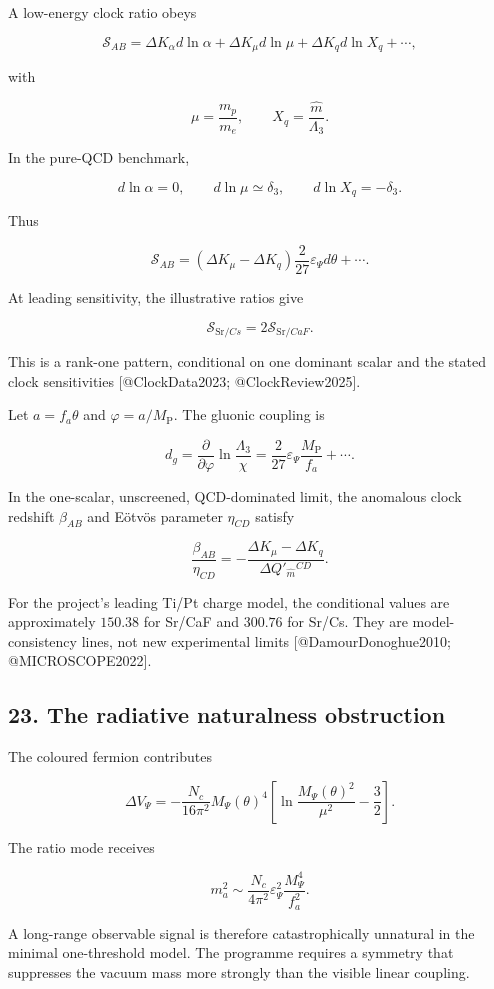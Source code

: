 \documentclass[
]{article}
\begin{document}
A low-energy clock ratio obeys

\[
\mathcal S_{AB}
=\Delta K_\alpha d\ln\alpha
+\Delta K_\mu d\ln\mu
+\Delta K_q d\ln X_q+\cdots,
\]

with

\[
\mu=\frac{m_p}{m_e},
\qquad
X_q=\frac{\widehat m}{\Lambda_3}.
\]

In the pure-QCD benchmark,

\[
d\ln\alpha=0,
\qquad
d\ln\mu\simeq\delta_3,
\qquad
d\ln X_q=-\delta_3.
\]

Thus

\[
\boxed{
\mathcal S_{AB}
=(\Delta K_\mu-\Delta K_q)
\frac{2}{27}\varepsilon_\Psi d\theta+\cdots.
}
\]

At leading sensitivity, the illustrative ratios give

\[
\mathcal S_{\mathrm{Sr}/Cs}
=2\mathcal S_{\mathrm{Sr}/CaF}.
\]

This is a rank-one pattern, conditional on one dominant scalar and the
stated clock sensitivities {[}@ClockData2023; @ClockReview2025{]}.

Let \(a=f_a\theta\) and \(\varphi=a/M_{\mathrm{P}}\). The gluonic
coupling is

\[
d_g
=\frac{\partial}{\partial\varphi}
\ln\frac{\Lambda_3}{\chi}
=\frac{2}{27}\varepsilon_\Psi\frac{M_{\mathrm{P}}}{f_a}+\cdots.
\]

In the one-scalar, unscreened, QCD-dominated limit, the anomalous clock
redshift \(\beta_{AB}\) and Eötvös parameter \(\eta_{CD}\) satisfy

\[
\boxed{
\frac{\beta_{AB}}{\eta_{CD}}
=-\frac{\Delta K_\mu-\Delta K_q}
{\Delta Q'_{\widehat m}{}^{CD}}.
}
\]

For the project's leading Ti/Pt charge model, the conditional values are
approximately \(150.38\) for Sr/CaF and \(300.76\) for Sr/Cs. They are
model-consistency lines, not new experimental limits
{[}@DamourDonoghue2010; @MICROSCOPE2022{]}.

\hypertarget{the-radiative-naturalness-obstruction}{%
\subsection{23. The radiative naturalness
obstruction}\label{the-radiative-naturalness-obstruction}}

The coloured fermion contributes

\[
\Delta V_\Psi
=-\frac{N_c}{16\pi^2}M_\Psi(\theta)^4
\left[\ln\frac{M_\Psi(\theta)^2}{\mu^2}-\frac32\right].
\]

The ratio mode receives

\[
\boxed{
m_a^2\sim\frac{N_c}{4\pi^2}
\varepsilon_\Psi^2\frac{M_\Psi^4}{f_a^2}.
}
\]

A long-range observable signal is therefore catastrophically unnatural
in the minimal one-threshold model. The programme requires a symmetry
that suppresses the vacuum mass more strongly than the visible linear
coupling.
\end{document}
